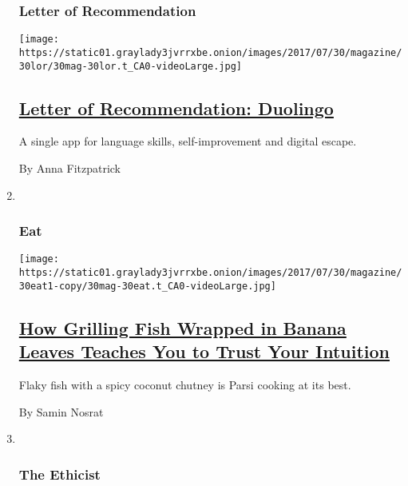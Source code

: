 \begin{enumerate}
{  \subsubsection{Letter of
  Recommendation}\label{letter-of-recommendation}}

  \texttt{[image: https://static01.graylady3jvrrxbe.onion/images/2017/07/30/magazine/30lor/30mag-30lor.t\_CA0-videoLarge.jpg]}

  \hypertarget{letter-of-recommendation-duolingo}{%
  \subsection{\texorpdfstring{\href{/2017/07/27/magazine/letter-of-recommendation-duolingo.html}{Letter
  of Recommendation:
  Duolingo}}{Letter of Recommendation: Duolingo}}\label{letter-of-recommendation-duolingo}}

  A single app for language skills, self-improvement and digital escape.

  By Anna Fitzpatrick
\item ~
  \hypertarget{eat}{%
  \subsubsection{Eat}\label{eat}}

  \texttt{[image: https://static01.graylady3jvrrxbe.onion/images/2017/07/30/magazine/30eat1-copy/30mag-30eat.t\_CA0-videoLarge.jpg]}

  \hypertarget{how-grilling-fish-wrapped-in-banana-leaves-teaches-you-to-trust-your-intuition}{%
  \subsection{\texorpdfstring{\href{/2017/07/27/magazine/how-grilling-fish-wrapped-in-banana-leaves-teaches-you-to-trust-your-intuition.html}{How
  Grilling Fish Wrapped in Banana Leaves Teaches You to Trust Your
  Intuition}}{How Grilling Fish Wrapped in Banana Leaves Teaches You to Trust Your Intuition}}\label{how-grilling-fish-wrapped-in-banana-leaves-teaches-you-to-trust-your-intuition}}

  Flaky fish with a spicy coconut chutney is Parsi cooking at its best.

  By Samin Nosrat
\item ~
  \hypertarget{the-ethicist}{%
  \subsubsection{The Ethicist}\label{the-ethicist}}


\end{enumerate}
